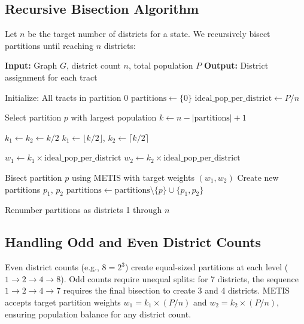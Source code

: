 \subsection{Recursive Bisection Algorithm}

Let $n$ be the target number of districts for a state. We recursively bisect partitions until reaching $n$ districts:

\begin{algorithm}[H]
\caption{Recursive Bisection Redistricting}
\begin{algorithmic}[1]
\State \textbf{Input:} Graph $G$, district count $n$, total population $P$
\State \textbf{Output:} District assignment for each tract

\State Initialize: All tracts in partition 0
\State $\text{partitions} \gets \{0\}$
\State $\text{ideal\_pop\_per\_district} \gets P / n$

    \State Select partition $p$ with largest population
    \State $k \gets n - |\text{partitions}| + 1$ 

        \State $k_1 \gets k_2 \gets k / 2$ 
    \Else
        \State $k_1 \gets \lfloor k / 2 \rfloor$, $k_2 \gets \lceil k / 2 \rceil$ 
    \EndIf

    \State $w_1 \gets k_1 \times \text{ideal\_pop\_per\_district}$
    \State $w_2 \gets k_2 \times \text{ideal\_pop\_per\_district}$

    \State Bisect partition $p$ using METIS with target weights $(w_1, w_2)$
    \State Create new partitions $p_1$, $p_2$
    \State $\text{partitions} \gets \text{partitions} \setminus \{p\} \cup \{p_1, p_2\}$
\EndWhile

\State Renumber partitions as districts 1 through $n$
\end{algorithmic}
\end{algorithm}

\subsection{Handling Odd and Even District Counts}

Even district counts (e.g., $8 = 2^3$) create equal-sized partitions at each level ($1 \to 2 \to 4 \to 8$). Odd counts require unequal splits: for 7 districts, the sequence $1 \to 2 \to 4 \to 7$ requires the final bisection to create 3 and 4 districts. METIS accepts target partition weights $w_1 = k_1 \times (P/n)$ and $w_2 = k_2 \times (P/n)$, ensuring population balance for any district count.

